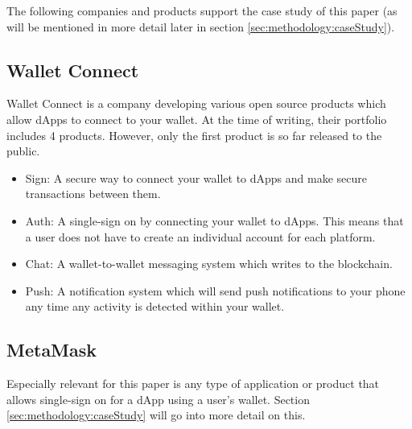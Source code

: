 The following companies and products support the case study  of this paper (as will be mentioned in more detail later in section \ref{sec:methodology:caseStudy}).

\subsection{Wallet Connect}
\label{sec:sota:walletConnect}
Wallet Connect \cite{walletConnect} is a company developing various open source products which allow dApps to connect to your wallet. At the time of writing, their portfolio includes 4 products. However, only the first product is so far released to the public.
\begin{itemize}
	\item Sign: A secure way to connect your wallet to dApps and make secure transactions between them. \cite{walletConnect}
	\item Auth: A single-sign on by connecting your wallet to dApps. This means that a user does not have to create an individual account for each platform. \cite{walletConnect}
	\item Chat: A wallet-to-wallet messaging system which writes to the blockchain. \cite{walletConnect}
	\item Push: A notification system which will send push notifications to your phone any time any activity is detected within your wallet. \cite{walletConnect}
\end{itemize}

\subsection{MetaMask}
\label{sec:sota:metaMask}



Especially relevant for this paper is any type of application or product that allows single-sign on for a dApp using a user's wallet. Section \ref{sec:methodology:caseStudy} will go into more detail on this.

